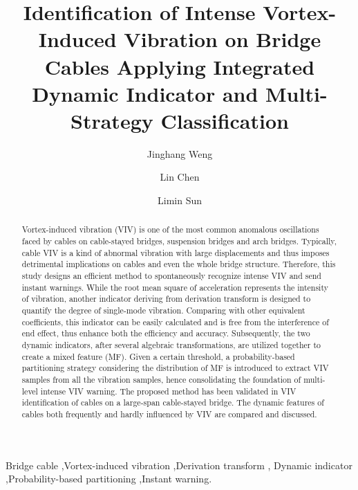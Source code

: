 \documentclass[preprint, 3p, times, compress, 11pt]{elsarticle}
\begin{document}
\begin{frontmatter}
\title{Identification of Intense Vortex-Induced Vibration on Bridge Cables 
        Applying Integrated Dynamic Indicator and Multi-Strategy Classification}
\author[tongji]{Jinghang Weng}
\author[tongji]{Lin Chen}
\author[tongji,lab,qizhi]{Limin Sun}
\address[tongji]{Department of Bridge Engineering, Tongji University, 
    Shanghai 200092, China}
\address[lab]{State Key Laboratory of Disaster Reduction of Civil 
    Engineering, Tongji University, Shanghai 200092, China}
\address[qizhi]{Shanghai Qi Zhi Institute, Shanghai 200092, China}

\begin{abstract}
Vortex-induced vibration (VIV) is one of the most common anomalous 
oscillations faced by cables on cable-stayed bridges, suspension bridges
and arch bridges. Typically, cable VIV is a kind of abnormal vibration 
with large displacements and thus imposes detrimental implications 
on cables and even the whole bridge structure. Therefore, this study 
designs an efficient method to spontaneously recognize intense VIV 
and send instant warnings. While the root mean square of acceleration 
represents the intensity of vibration, another indicator deriving from 
derivation transform is designed to quantify the degree of single-mode 
vibration. Comparing with other equivalent coefficients, this indicator 
can be easily calculated and is free from the interference of end effect, 
thus enhance both the efficiency and accuracy. Subsequently, the two 
dynamic indicators, after several algebraic transformations, are utilized 
together to create a mixed feature (MF). Given a certain threshold, a 
probability-based partitioning strategy considering the distribution 
of MF is introduced to extract VIV samples from all the vibration samples, 
hence consolidating the foundation of multi-level intense VIV warning. 
The proposed method has been validated in VIV identification of cables on 
a large-span cable-stayed bridge. The dynamic features of cables both
frequently and hardly influenced by VIV are compared and discussed. 
\end{abstract}

\begin{keyword}
Bridge cable \sep Vortex-induced vibration \sep Derivation transform \sep 
Dynamic indicator \sep Probability-based partitioning \sep Instant warning. 
\end{keyword}
\end{frontmatter}
\end{document}
